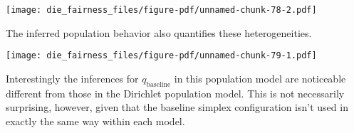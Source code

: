 \documentclass[
  letterpaper,
  DIV=11,
  numbers=noendperiod]{scrartcl}
\newenvironment{Shaded}{\begin{snugshade}}{\end{snugshade}}
\newcommand{\AttributeTok}[1]{\textcolor[rgb]{0.40,0.45,0.13}{#1}}
\newcommand{\ControlFlowTok}[1]{\textcolor[rgb]{0.00,0.23,0.31}{#1}}
\newcommand{\DecValTok}[1]{\textcolor[rgb]{0.68,0.00,0.00}{#1}}
\newcommand{\FloatTok}[1]{\textcolor[rgb]{0.68,0.00,0.00}{#1}}
\newcommand{\FunctionTok}[1]{\textcolor[rgb]{0.28,0.35,0.67}{#1}}
\newcommand{\NormalTok}[1]{\textcolor[rgb]{0.00,0.23,0.31}{#1}}
\newcommand{\OtherTok}[1]{\textcolor[rgb]{0.00,0.23,0.31}{#1}}
\newcommand{\SpecialCharTok}[1]{\textcolor[rgb]{0.37,0.37,0.37}{#1}}
\newcommand{\StringTok}[1]{\textcolor[rgb]{0.13,0.47,0.30}{#1}}
\begin{document}
\texttt{[image: die\_fairness\_files/figure-pdf/unnamed-chunk-78-2.pdf]}

The inferred population behavior also quantifies these heterogeneities.

\begin{Shaded}
\end{Shaded}

\texttt{[image: die\_fairness\_files/figure-pdf/unnamed-chunk-79-1.pdf]}

Interestingly the inferences for \(q_{\mathrm{baseline}}\) in this
population model are noticeable different from those in the Dirichlet
population model. This is not necessarily surprising, however, given
that the baseline simplex configuration isn't used in exactly the same
way within each model.
\end{document}
